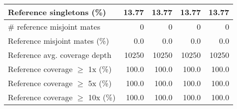 \documentclass[12pt,a4paper]{article}
\begin{document}
\begin{table}[ht]
\begin{center}
\begin{tabular}{|l*{4}{|r}|}
Reference singletons (\%) & 13.77 & 13.77 & 13.77 & 13.77 \\ \hline
\# reference misjoint mates & 0 & 0 & 0 & 0 \\ \hline
Reference misjoint mates (\%) & 0.0 & 0.0 & 0.0 & 0.0 \\ \hline
Reference avg. coverage depth & 10250 & 10250 & 10250 & 10250 \\ \hline
Reference coverage $\geq$ 1x (\%) & 100.0 & 100.0 & 100.0 & 100.0 \\ \hline
Reference coverage $\geq$ 5x (\%) & 100.0 & 100.0 & 100.0 & 100.0 \\ \hline
Reference coverage $\geq$ 10x (\%) & 100.0 & 100.0 & 100.0 & 100.0 \\ \hline
\end{tabular}
\end{center}
\end{table}
\end{document}
